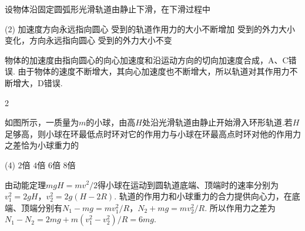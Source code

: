 \begin{problem} %
    设物体沿固定圆弧形光滑轨道由静止下滑，在下滑过程中
    \begin{tasks}(2)
        \task 加速度方向永远指向圆心
        \task[\true] 受到的轨道作用力的大小不断增加
        \task 受到的外力大小变化，方向永远指向圆心
        \task 受到的外力大小不变
    \end{tasks}
\end{problem}
\begin{solution}
    物体的加速度由指向圆心的向心加速度和沿运动方向的切向加速度合成，A、C错误. 由于物体的速度不断增大，其向心加速度也不断增大，所以轨道对其作用力不断增大，D错误.
\end{solution}

\begin{paracol}{2}
\begin{problem} %
    如图所示，一质量为$m$的小球，由高$H$处沿光滑轨道由静止开始滑入环形轨道.若$H$足够高，则小球在环最低点时环对它的作用力与小球在环最高点时环对他的作用力之差恰为小球重力的
    \begin{tasks}(4)
        \task $2$倍
        \task $4$倍
        \task[\true] $6$倍
        \task $8$倍
    \end{tasks}
    \switchcolumn\vspace*{\fill}\centering
    \vspace*{\fill}
\end{problem}
\end{paracol}
\begin{solution}
    由动能定理$mgH=mv^2/2$得小球在运动到圆轨道底端、顶端时的速率分别为$v_1^2=2gH$，$v_2^2=2g(H-2R)$. 轨道的作用力和小球重力的合力提供向心力，在底端、顶端分别有$N_1-mg=mv_1^2/R$，$N_2+mg=mv_2^2/R$. 所以作用力之差为$N_1-N_2=2mg+m(v_1^2-v_2^2)/R=6mg$.
\end{solution}

